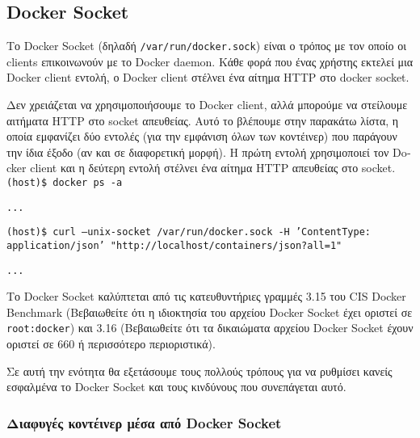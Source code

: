\subsection{\textlatin{Docker Socket}}

Το \textlatin{Docker Socket} (δηλαδή \texttt{\textlatin{/var/run/docker.sock}})
είναι ο τρόπος με τον οποίο οι \textlatin{clients} επικοινωνούν με το
\textlatin{Docker daemon}. Κάθε φορά που ένας χρήστης εκτελεί μια
\textlatin{Docker client} εντολή, ο \textlatin{Docker client} στέλνει ένα
αίτημα \textlatin{HTTP} στο \textlatin{docker socket}.

Δεν χρειάζεται να χρησιμοποιήσουμε το \textlatin{Docker client}, αλλά μπορούμε
να στείλουμε αιτήματα \textlatin{HTTP} στο \textlatin{socket} απευθείας. Αυτό
το βλέπουμε στην παρακάτω λίστα, η οποία εμφανίζει δύο εντολές
(για την εμφάνιση όλων των κοντέινερ) που παράγουν την ίδια έξοδο (αν και σε
διαφορετική μορφή). Η πρώτη εντολή χρησιμοποιεί τον \textlatin{Docker client}
και η δεύτερη εντολή στέλνει ένα αίτημα \textlatin{HTTP} απευθείας στο
\textlatin{socket}. \\

\texttt{\textlatin{(host)\$ docker ps -a}}

\texttt{\textlatin{...}}

\texttt{\textlatin{(host)\$ curl --unix-socket /var/run/docker.sock -H 'ContentType: application/json' "http://localhost/containers/json?all=1"}}

\texttt{\textlatin{...}}

Το \textlatin{Docker Socket} καλύπτεται από τις κατευθυντήριες γραμμές 3.15 του
\textlatin{CIS Docker Benchmark}
(Βεβαιωθείτε ότι η ιδιοκτησία του αρχείου \textlatin{Docker Socket} έχει
οριστεί σε \texttt{\textlatin{root:docker}}) και 3.16 (Βεβαιωθείτε ότι τα
δικαιώματα αρχείου \textlatin{Docker Socket} έχουν οριστεί σε 660 ή περισσότερο
περιοριστικά).

Σε αυτή την ενότητα θα εξετάσουμε τους πολλούς τρόπους για να ρυθμίσει κανείς
εσφαλμένα το \textlatin{Docker Socket} και τους κινδύνους
\cite{The-Dangers-Of-Docker-Sock} που συνεπάγεται αυτό.

\subsubsection{Διαφυγές κοντέινερ μέσα από \textlatin{Docker Socket}}

